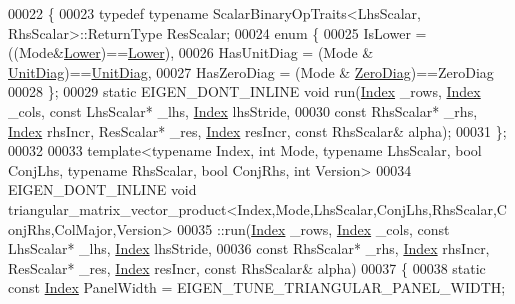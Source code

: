 \begin{DoxyCode}
00022 \{
00023   \textcolor{keyword}{typedef} \textcolor{keyword}{typename} ScalarBinaryOpTraits<LhsScalar, RhsScalar>::ReturnType ResScalar;
00024   \textcolor{keyword}{enum} \{
00025     IsLower = ((Mode&\hyperlink{group__enums_gga39e3366ff5554d731e7dc8bb642f83cda891792b8ed394f7607ab16dd716f60e6}{Lower})==\hyperlink{group__enums_gga39e3366ff5554d731e7dc8bb642f83cda891792b8ed394f7607ab16dd716f60e6}{Lower}),
00026     HasUnitDiag = (Mode & \hyperlink{group__enums_gga39e3366ff5554d731e7dc8bb642f83cdaddb72f888ac85d5a1c52333e54f9374b}{UnitDiag})==\hyperlink{group__enums_gga39e3366ff5554d731e7dc8bb642f83cdaddb72f888ac85d5a1c52333e54f9374b}{UnitDiag},
00027     HasZeroDiag = (Mode & \hyperlink{group__enums_gga39e3366ff5554d731e7dc8bb642f83cda884ff7240392e85aa6e4b3c957e36483}{ZeroDiag})==ZeroDiag
00028   \};
00029   \textcolor{keyword}{static} EIGEN\_DONT\_INLINE  \textcolor{keywordtype}{void} run(\hyperlink{namespace_eigen_a62e77e0933482dafde8fe197d9a2cfde}{Index} \_rows, \hyperlink{namespace_eigen_a62e77e0933482dafde8fe197d9a2cfde}{Index} \_cols, \textcolor{keyword}{const} LhsScalar* \_lhs, 
      \hyperlink{namespace_eigen_a62e77e0933482dafde8fe197d9a2cfde}{Index} lhsStride,
00030                                      \textcolor{keyword}{const} RhsScalar* \_rhs, \hyperlink{namespace_eigen_a62e77e0933482dafde8fe197d9a2cfde}{Index} rhsIncr, ResScalar* \_res, 
      \hyperlink{namespace_eigen_a62e77e0933482dafde8fe197d9a2cfde}{Index} resIncr, \textcolor{keyword}{const} RhsScalar& alpha);
00031 \};
00032 
00033 \textcolor{keyword}{template}<\textcolor{keyword}{typename} Index, \textcolor{keywordtype}{int} Mode, \textcolor{keyword}{typename} LhsScalar, \textcolor{keywordtype}{bool} ConjLhs, \textcolor{keyword}{typename} RhsScalar, \textcolor{keywordtype}{bool} ConjRhs, \textcolor{keywordtype}{int} 
      Version>
00034 EIGEN\_DONT\_INLINE \textcolor{keywordtype}{void} 
      triangular\_matrix\_vector\_product<Index,Mode,LhsScalar,ConjLhs,RhsScalar,ConjRhs,ColMajor,Version>
00035   ::run(\hyperlink{namespace_eigen_a62e77e0933482dafde8fe197d9a2cfde}{Index} \_rows, \hyperlink{namespace_eigen_a62e77e0933482dafde8fe197d9a2cfde}{Index} \_cols, \textcolor{keyword}{const} LhsScalar* \_lhs, \hyperlink{namespace_eigen_a62e77e0933482dafde8fe197d9a2cfde}{Index} lhsStride,
00036         \textcolor{keyword}{const} RhsScalar* \_rhs, \hyperlink{namespace_eigen_a62e77e0933482dafde8fe197d9a2cfde}{Index} rhsIncr, ResScalar* \_res, \hyperlink{namespace_eigen_a62e77e0933482dafde8fe197d9a2cfde}{Index} resIncr, \textcolor{keyword}{const} RhsScalar& 
      alpha)
00037   \{
00038     \textcolor{keyword}{static} \textcolor{keyword}{const} \hyperlink{namespace_eigen_a62e77e0933482dafde8fe197d9a2cfde}{Index} PanelWidth = EIGEN\_TUNE\_TRIANGULAR\_PANEL\_WIDTH;

\end{DoxyCode}
